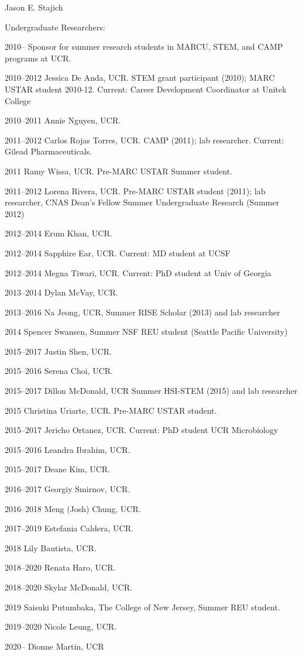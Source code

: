 \documentclass[10pt]{article}
\begin{document}
\begin{cv}{\centerline{Jason E. Stajich}}
\begin{cvlistcompact}{Undergraduate Researchers:}
\item[2010--] Sponsor for summer research students in MARCU, STEM, and CAMP
  programs at UCR.
\item [2010--2012] Jessica De Anda, UCR. STEM grant participant
  (2010); MARC USTAR student 2010-12. Current: Career Development Coordinator at Unitek College
\item [2010--2011] Annie Nguyen, UCR.
\item [2011--2012] Carlos Rojas Torres, UCR. CAMP (2011); lab
  researcher. Current: Gilead Pharmaceuticals.
\item [2011] Ramy Wissa, UCR. Pre-MARC USTAR Summer student.
\item [2011--2012] Lorena Rivera, UCR. Pre-MARC USTAR student (2011); lab
  researcher, CNAS Dean's Fellow Summer Undergraduate Research (Summer 2012)
\item [2012--2014] Erum Khan, UCR.
\item [2012--2014] Sapphire Ear, UCR. Current: MD student at UCSF
\item [2012--2014] Megna Tiwari, UCR. Current: PhD student at Univ of Georgia
\item [2013--2014] Dylan McVay, UCR.
\item [2013--2016] Na Jeong, UCR, Summer RISE Scholar (2013) and lab researcher
\item [2014] Spencer Swansen, Summer NSF REU student (Seattle Pacific University)
\item [2015--2017] Justin Shen, UCR.
\item [2015--2016] Serena Choi, UCR.
\item [2015--2017] Dillon McDonald, UCR Summer HSI-STEM (2015) and lab researcher
\item [2015] Christina Uriarte, UCR. Pre-MARC USTAR student.
\item [2015--2017] Jericho Ortanez, UCR. Current: PhD student UCR Microbiology
\item [2015--2016] Leandra Ibrahim, UCR.
\item [2015--2017] Deane Kim, UCR.
\item [2016--2017] Georgiy Smirnov, UCR.
\item [2016--2018] Meng (Josh) Chung, UCR.
\item [2017--2019] Estefania Caldera, UCR.
\item [2018] Lily Bautista, UCR.
\item [2018--2020] Renata Haro, UCR.
\item [2018--2020] Skylar McDonald, UCR.
\item [2019] Saisuki Putumbaka, The College of New Jersey, Summer REU student.
\item [2019--2020] Nicole Leung, UCR.
\item [2020--] Dionne Martin, UCR


\end{cvlistcompact}
\end{cv}
\end{document}
